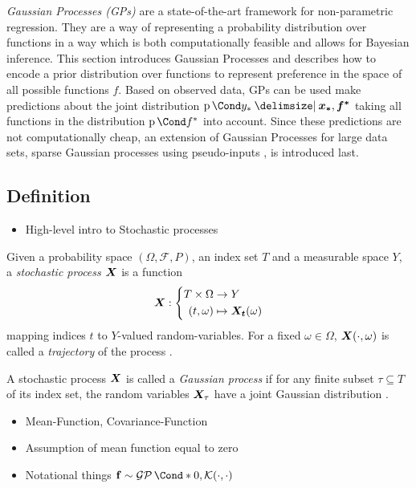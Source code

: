 \emph{Gaussian Processes (GPs)} are a state-of-the-art framework for non-parametric regression.
They are a way of representing a probability distribution over functions in a way which is both computationally feasible and allows for Bayesian inference.
This section introduces Gaussian Processes and describes how to encode a prior distribution over functions to represent preference in the space of all possible functions $f$.
Based on observed data, GPs can be used make predictions about the joint distribution $\Prob{y_\ast \given \mat{x_\ast}, \mat{f^\ast}}$ taking all functions in the distribution $\Prob{f^\ast}$ into account.
Since these predictions are not computationally cheap, an extension of Gaussian Processes for large data sets, sparse Gaussian processes using pseudo-inputs \cite{snelson_sparse_2005}, is introduced last.

\subsection{Definition}
\begin{itemize}
    \item High-level intro to Stochastic processes
\end{itemize}
\begin{definition}
    \label{def:stochastic_process}
    Given a probability space $(\Omega, \mathcal{F}, P)$, an index set $T$ and a measurable space $Y$, a \emph{stochastic process $\bm{X}$} is a function
    \begin{align}
        \bm{X} : \left\{\begin{aligned}
            T \times \Omega &\to Y \\
            (t, \omega) &\mapsto \bm{X_t}(\omega)
        \end{aligned}\right.
    \end{align}
    mapping indices $t$ to $Y$-valued random-variables.
    For a fixed $\omega \in \Omega$, $\bm{X}(\cdot, \omega)$ is called a \emph{trajectory} of the process \cite{astrom_introduction_1971}.
\end{definition}
\begin{definition}
    \label{def:gaussian_process}
    A stochastic process $\bm{X}$ is called a \emph{Gaussian process} if for any finite subset $\tau \subseteq T$ of its index set, the random variables $\bm{X}_\tau$ have a joint Gaussian distribution \cite{astrom_introduction_1971}.
\end{definition}
\begin{itemize}
    \item Mean-Function, Covariance-Function
    \item Assumption of mean function equal to zero
    \item Notational things $\Dyn \sim \GP\Cond*{0, \K(\cdot, \cdot)}$
\end{itemize}

